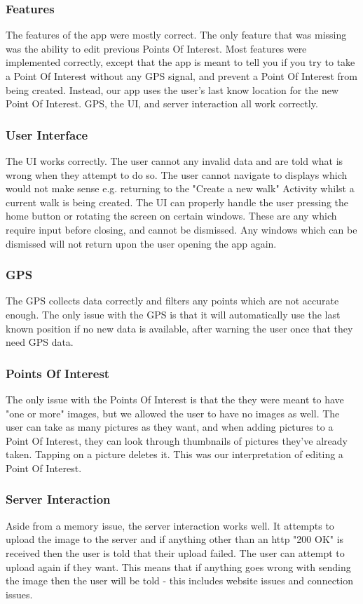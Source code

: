 \documentclass{project}
\begin{document}
\subsubsection{Features}
The features of the app were mostly correct. The only feature that was missing was the ability to edit previous
Points Of Interest.
Most features were implemented correctly, except that the app is meant to tell you if you try to take a Point Of Interest
without any GPS signal, and prevent a Point Of Interest from being created. Instead, our app uses the user's last know location
for the new Point Of Interest.
GPS, the UI, and server interaction all work correctly.

\subsubsection{User Interface}
The UI works correctly. The user cannot any invalid data and are told what is wrong when they attempt to do so.
The user cannot navigate to displays which would not make sense e.g. returning to the "Create a new walk" Activity
whilst a current walk is being created.
The UI can properly handle the user pressing the home button or rotating the screen on certain windows. These are
any which require input before closing, and cannot be dismissed. Any windows which can be dismissed will not return
upon the user opening the app again.


\subsubsection{GPS}
The GPS collects data correctly and filters any points which are not accurate enough. The only issue
with the GPS is that it will automatically use the last known position if no new data is available, after
warning the user once that they need GPS data.


\subsubsection{Points Of Interest}
The only issue with the Points Of Interest is that the they were meant to have "one or more" images, but we allowed the
user to have no images as well.
The user can take as many pictures as they want, and when adding pictures to a Point Of Interest, they can look through thumbnails
of pictures they've already taken. Tapping on a picture deletes it. This was our interpretation of editing a Point Of Interest.

\subsubsection{Server Interaction}
Aside from a memory issue, the server interaction works well. It attempts to upload the image to the server and if anything
other than an http "200 OK" is received then the user is told that their upload failed. The user can attempt to upload again
if they want. This means that if anything goes wrong with sending the image then the user will be told - this includes website
issues and connection issues.
\end{document}
